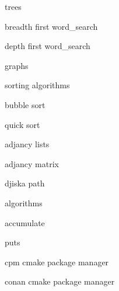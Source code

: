          trees 
        
         breadth first word_search 
        
         depth first word_search 
        
         graphs 
        
         sorting algorithms 
        
         bubble sort 
        
         quick sort 
        
         adjancy lists
        
         adjancy matrix 
        
         djiska path 
        
         algorithms 
        
         accumulate
        
         puts 
        
         cpm cmake package manager
        
         conan cmake package manager
